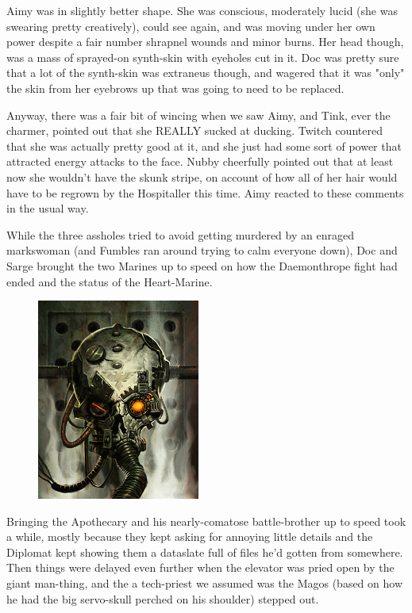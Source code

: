 Aimy was in slightly better shape. 
She was conscious, moderately lucid (she was swearing pretty creatively), could see again, and was moving under her own power despite a fair number shrapnel wounds and minor burns. 
Her head though, was a mass of sprayed-on synth-skin with eyeholes cut in it. 
Doc was pretty sure that a lot of the synth-skin was extraneus though, and wagered that it was "only" the skin from her eyebrows up that was going to need to be replaced.

Anyway, there was a fair bit of wincing when we saw Aimy, and Tink, ever the charmer, pointed out that she REALLY sucked at ducking. 
Twitch countered that she was actually pretty good at it, and she just had some sort of power that attracted energy attacks to the face. 
Nubby cheerfully pointed out that at least now she wouldn't have the skunk stripe, on account of how all of her hair would have to be regrown by the Hospitaller this time. 
Aimy reacted to these comments in the usual way.

While the three assholes tried to avoid getting murdered by an enraged markswoman (and Fumbles ran around trying to calm everyone down), Doc and Sarge brought the two Marines up to speed on how the Daemonthrope fight had ended and the status of the Heart-Marine.

\begin{figure}
	\begin{center}
		\includegraphics[width=\figwidth]{pics/16/64.png}
	\end{center}
\end{figure}
Bringing the Apothecary and his nearly-comatose battle-brother up to speed took a while, mostly because they kept asking for annoying little details and the Diplomat kept showing them a dataslate full of files he'd gotten from somewhere. 
Then things were delayed even further when the elevator was pried open by the giant man-thing, and the a tech-priest we assumed was the Magos (based on how he had the big servo-skull perched on his shoulder) stepped out.

